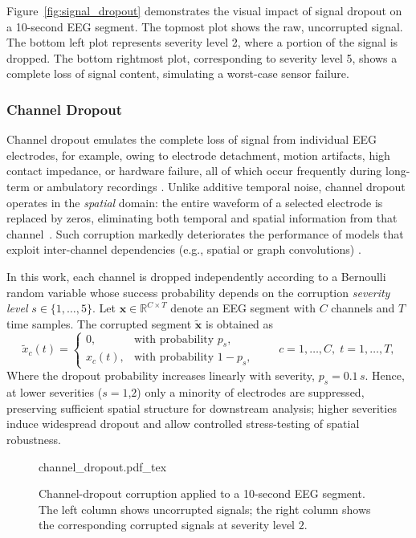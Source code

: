 Figure~\ref{fig:signal_dropout} demonstrates the visual impact of signal dropout on a 10-second EEG segment. The topmost plot shows the raw, uncorrupted signal. The bottom left plot represents severity level 2, where a portion of the signal is dropped. The bottom rightmost plot, corresponding to severity level 5, shows a complete loss of signal content, simulating a worst-case sensor failure.

\subsubsection{Channel Dropout}
Channel dropout emulates the complete loss of signal from individual EEG electrodes, for example, owing to electrode detachment, motion artifacts, high contact impedance, or hardware failure, all of which occur frequently during long-term or ambulatory recordings \cite{channel_dropout1,channel_dropout4}.  
Unlike additive temporal noise, channel dropout operates in the \emph{spatial} domain: the entire waveform of a selected electrode is replaced by zeros, eliminating both temporal and spatial information from that channel~\cite{channel_dropout3}. Such corruption markedly deteriorates the performance of models that exploit inter-channel dependencies (e.g., spatial or graph convolutions) \cite{channel_dropout2,channel_dropout3}.

In this work, each channel is dropped independently according to a Bernoulli random variable whose success probability depends on the corruption \emph{severity level} \(s\in\{1,\dots,5\}\).  
Let \(\mathbf{x}\in\mathbb{R}^{C\times T}\) denote an EEG segment with \(C\) channels and \(T\) time samples. The corrupted segment \(\tilde{\mathbf{x}}\) is obtained as
\begin{equation}
\tilde{x}_{c}(t)=
\begin{cases}
0, & \text{with probability } p_{s},\\[4pt]
x_{c}(t), & \text{with probability } 1-p_{s},
\end{cases}\qquad
c=1,\dots,C,\;t=1,\dots,T,
\label{eq:channel_dropout}
\end{equation}
Where the dropout probability increases linearly with severity, \(p_{s}=0.1\,s\). Hence, at lower severities (\(s{=}1\),\(2\)) only a minority of electrodes are suppressed, preserving sufficient spatial structure for downstream analysis; higher severities induce widespread dropout and allow controlled stress-testing of spatial robustness.

\begin{figure}[h!]
    \centering
    \def\svgwidth{380pt}
    {channel_dropout.pdf_tex}
    \caption[Effect of Channel Dropout on a 10-s EEG segment]{Channel-dropout corruption applied to a 10-second EEG segment. The left column shows uncorrupted signals; the right column shows the corresponding corrupted signals at severity level \(2\).}
    \label{fig:channel_dropout}
\end{figure}

